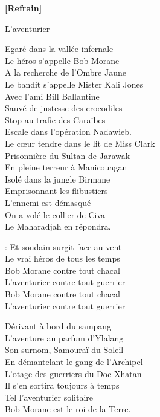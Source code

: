\documentclass{novel}
\begin{document}
\textbf{[Refrain]}

\newpage
\normalsize
\h*{L’aventurier}

Egaré dans la vallée infernale\\
Le héros s'appelle Bob Morane\\
A la recherche de l'Ombre Jaune\\
Le bandit s'appelle Mister Kali Jones\\
Avec l'ami Bill Ballantine\\
Sauvé de justesse des crocodiles\\
Stop au trafic des Caraïbes\\
Escale dans l'opération Nadawieb.\\

Le cœur tendre dans le lit de Miss Clark\\
Prisonnière du Sultan de Jarawak\\
En pleine terreur à Manicouagan\\
Isolé dans la jungle Birmane\\
Emprisonnant les flibustiers\\
L'ennemi est démasqué\\
On a volé le collier de Civa\\
Le Maharadjah en répondra.\\

\begin{bfseries}
[Refrain]:
Et soudain surgit face au vent\\
Le vrai héros de tous les temps\\
Bob Morane contre tout chacal\\
L'aventurier contre tout guerrier\\
Bob Morane contre tout chacal\\
L'aventurier contre tout guerrier\\
\end{bfseries}

Dérivant à bord du sampang\\
L'aventure au parfum d'Ylalang\\
Son surnom, Samouraï du Soleil\\
En démantelant le gang de l'Archipel\\
L'otage des guerriers du Doc Xhatan\\
Il s'en sortira toujours à temps\\
Tel l'aventurier solitaire\\
Bob Morane est le roi de la Terre.\\
\end{document}
